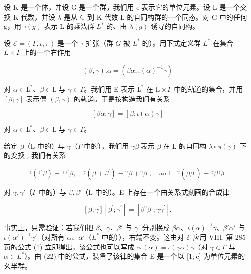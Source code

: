设 K 是一个体，并设 G 是一个群，我们用 e 表示它的单位元素。设 L 是一个交换 K-代数，并设 \(\lambda\) 是从 G 到 K-代数 L 的自同构群的一个同态。对 G 中的任何 g，用 \(\tau(g)\) 表示 L 的乘法群 \(L^{*}\) 的、由 \(\lambda(g)\) 诱导的自同构。

设 \(\mathcal{E} = (\Gamma, \iota, \pi)\) 是一个 \(\tau\)-扩张（群 \(G\) 被 \(L^*\) 的）。用下式定义群 \(L^*\) 在集合 \(L \times \Gamma\) 上的一个右作用

\[
(\beta , \gamma). \alpha = (\beta \alpha , \iota (\alpha) ^ {- 1} \gamma)\tag{20}
\]

对 \(\alpha \in \mathrm{L}^*\)、\(\beta \in \mathrm{L}\) 与 \(\gamma \in \Gamma\)。我们用 E 表示 \(\mathrm{L}^*\) 在 \(\mathrm{L} \times \Gamma\) 中的轨道的集合，并用 \([\beta; \gamma]\) 表示偶 \((\beta, \gamma)\) 的轨道。于是按构造我们有关系

\[
[ \beta \alpha ; \gamma ] = [ \beta ; \iota (\alpha) \gamma ]\tag{21}
\]

对 \(\alpha\in\mathrm{L}^{*}\)、\(\beta\in\mathrm{L}\) 与 \(\gamma\in\Gamma\)。

给定 \(\beta\)（L 中的）与 \(\gamma\)（\(\Gamma\) 中的），我们用 \(\gamma\beta\) 表示 \(\beta\) 在 L 的自同构 \(\lambda\circ\pi(\gamma)\) 下的变换；我们有关系

\[
{ } ^ { \gamma } ( { } ^ { \gamma } { } ^ { \prime } \beta ) = { } ^ { \gamma } { } ^ { \gamma } { } ^ { \prime } \beta   , \quad { } ^ { \gamma } ( \beta + \beta ^ { \prime } ) = { } ^ { \gamma } \beta + { } ^ { \gamma } \beta ^ { \prime }   , \quad \text {and} \quad { } ^ { \gamma } ( \beta \beta ^ { \prime } ) = { } ^ { \gamma } \beta   { } ^ { \gamma } \beta ^ { \prime }\tag{22}
\]

对 \(\gamma,\gamma'\)（\(\Gamma\) 中的）与 \(\beta,\beta'\)（L 中的）。E 上存在一个由关系式刻画的合成律

\[
[ \beta ; \gamma ] [ \beta^ {\prime}; \gamma^ {\prime} ] = [ \beta^ {\gamma} \beta^ {\prime}; \gamma \gamma^ {\prime} ].\tag{23}
\]

事实上，只需验证：若我们把 \(\beta\)、\(\gamma\)、\(\beta'\) 与 \(\gamma'\) 分别换成 \(\beta\alpha\)、\(\iota(\alpha)^{-1}\gamma\)、\(\beta'\alpha'\) 与 \(\iota(\alpha')^{-1}\gamma'\)（对所有 \(\alpha\)、\(\alpha'\)（\(L^*\) 中的）），右端不变。这由对 \(\mathcal{E}\) 应用 VIII, 第 285 页的公式 (1) 立即得出，该公式也可以写成 \(\gamma\iota(\alpha) = \iota(\gamma\alpha)\gamma\)（对 \(\gamma \in \Gamma\) 与 \(\alpha \in L^*\)）。由 (22) 中的公式，装备了该律的集合 E 是一个以 {[}1; e{]} 为单位元素的幺半群。

